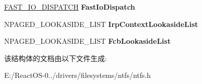 \begin{DoxyCompactItemize}
\item 
\mbox{\label{struct_n_t_f_s___g_l_o_b_a_l___d_a_t_a_a3b15a41e1944bb8301db167a4d8c5e86}} 
\hyperlink{struct___f_a_s_t___i_o___d_i_s_p_a_t_c_h}{F\+A\+S\+T\+\_\+\+I\+O\+\_\+\+D\+I\+S\+P\+A\+T\+CH} {\bfseries Fast\+Io\+Dispatch}
\item 
\mbox{\label{struct_n_t_f_s___g_l_o_b_a_l___d_a_t_a_a7dcea5d7997053542343cf38d4371cee}} 
N\+P\+A\+G\+E\+D\+\_\+\+L\+O\+O\+K\+A\+S\+I\+D\+E\+\_\+\+L\+I\+ST {\bfseries Irp\+Context\+Lookaside\+List}
\item 
\mbox{\label{struct_n_t_f_s___g_l_o_b_a_l___d_a_t_a_a1039ef7fa65d27c55f7581ca6d7a30b6}} 
N\+P\+A\+G\+E\+D\+\_\+\+L\+O\+O\+K\+A\+S\+I\+D\+E\+\_\+\+L\+I\+ST {\bfseries Fcb\+Lookaside\+List}
\end{DoxyCompactItemize}


该结构体的文档由以下文件生成\+:\begin{DoxyCompactItemize}
\item 
E\+:/\+React\+O\+S-\/0../drivers/filesystems/ntfs/ntfs.\+h\end{DoxyCompactItemize}

